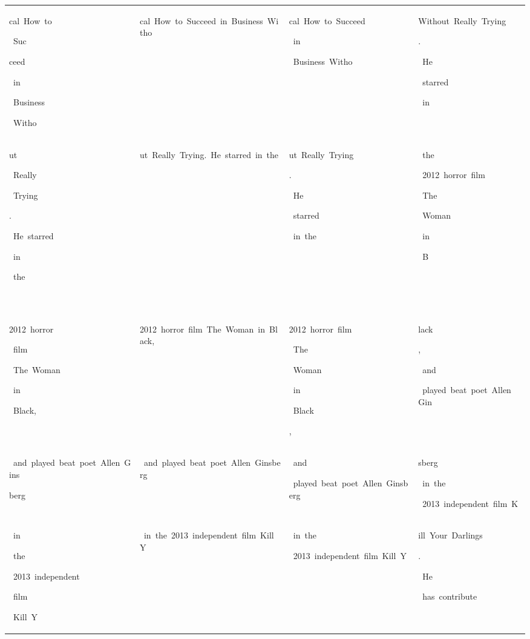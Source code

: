 \begin{table}[h]
\begin{tabular}{ l l l l }
 \colorbox{cm_63!40}{\strut cal\ How\ to}\colorbox{cm_34!40}{\strut \ Suc}\colorbox{cm_32!40}{\strut ceed}\colorbox{cm_39!40}{\strut \ in}\colorbox{cm_33!40}{\strut \ Business}\colorbox{cm_37!40}{\strut \ Witho} & \colorbox{cm_63!40}{\strut cal\ How\ to\ Succeed\ in\ Business\ Witho} & \colorbox{cm_0!40}{\strut cal\ How\ to\ Succeed}\colorbox{cm_12!40}{\strut \ in}\colorbox{cm_0!40}{\strut \ Business\ Witho} & \colorbox{cm_0!40}{\strut Without\ Really\ Trying}\colorbox{cm_12!40}{\strut .}\colorbox{cm_25!40}{\strut \ He}\colorbox{cm_0!40}{\strut \ starred}\colorbox{cm_12!40}{\strut \ in} \\ 
 \colorbox{cm_37!40}{\strut ut}\colorbox{cm_34!40}{\strut \ Really}\colorbox{cm_32!40}{\strut \ Trying}\colorbox{cm_51!40}{\strut .}\colorbox{cm_63!40}{\strut \ He\ starred}\colorbox{cm_53!40}{\strut \ in}\colorbox{cm_60!40}{\strut \ the}\colorbox{cm_63!40}{\strut \ } & \colorbox{cm_63!40}{\strut ut\ Really\ Trying.\ He\ starred\ in\ the\ } & \colorbox{cm_0!40}{\strut ut\ Really\ Trying}\colorbox{cm_12!40}{\strut .}\colorbox{cm_25!40}{\strut \ He}\colorbox{cm_0!40}{\strut \ starred}\colorbox{cm_12!40}{\strut \ in\ the}\colorbox{cm_0!40}{\strut \ } & \colorbox{cm_12!40}{\strut \ the}\colorbox{cm_0!40}{\strut \ 2012\ horror\ film}\colorbox{cm_12!40}{\strut \ The}\colorbox{cm_0!40}{\strut \ Woman}\colorbox{cm_12!40}{\strut \ in}\colorbox{cm_0!40}{\strut \ B} \\ 
 \colorbox{cm_63!40}{\strut 2012\ horror}\colorbox{cm_54!40}{\strut \ film}\colorbox{cm_63!40}{\strut \ The\ Woman}\colorbox{cm_39!40}{\strut \ in}\colorbox{cm_63!40}{\strut \ Black,} & \colorbox{cm_63!40}{\strut 2012\ horror\ film\ The\ Woman\ in\ Black,} & \colorbox{cm_0!40}{\strut 2012\ horror\ film}\colorbox{cm_12!40}{\strut \ The}\colorbox{cm_0!40}{\strut \ Woman}\colorbox{cm_12!40}{\strut \ in}\colorbox{cm_0!40}{\strut \ Black}\colorbox{cm_12!40}{\strut ,} & \colorbox{cm_0!40}{\strut lack}\colorbox{cm_12!40}{\strut ,}\colorbox{cm_25!40}{\strut \ and}\colorbox{cm_0!40}{\strut \ played\ beat\ poet\ Allen\ Gin} \\ 
 \colorbox{cm_63!40}{\strut \ and\ played\ beat\ poet\ Allen\ Gins}\colorbox{cm_32!40}{\strut berg} & \colorbox{cm_63!40}{\strut \ and\ played\ beat\ poet\ Allen\ Ginsberg} & \colorbox{cm_25!40}{\strut \ and}\colorbox{cm_0!40}{\strut \ played\ beat\ poet\ Allen\ Ginsberg} & \colorbox{cm_0!40}{\strut sberg}\colorbox{cm_12!40}{\strut \ in\ the}\colorbox{cm_0!40}{\strut \ 2013\ independent\ film\ K} \\ 
 \colorbox{cm_36!40}{\strut \ in}\colorbox{cm_58!40}{\strut \ the}\colorbox{cm_63!40}{\strut \ 2013\ independent}\colorbox{cm_58!40}{\strut \ film}\colorbox{cm_63!40}{\strut \ Kill\ Y} & \colorbox{cm_63!40}{\strut \ in\ the\ 2013\ independent\ film\ Kill\ Y} & \colorbox{cm_12!40}{\strut \ in\ the}\colorbox{cm_0!40}{\strut \ 2013\ independent\ film\ Kill\ Y} & \colorbox{cm_0!40}{\strut ill\ Your\ Darlings}\colorbox{cm_12!40}{\strut .}\colorbox{cm_25!40}{\strut \ He}\colorbox{cm_0!40}{\strut \ has\ contribute} \\ 

\end{tabular}
\end{table}
